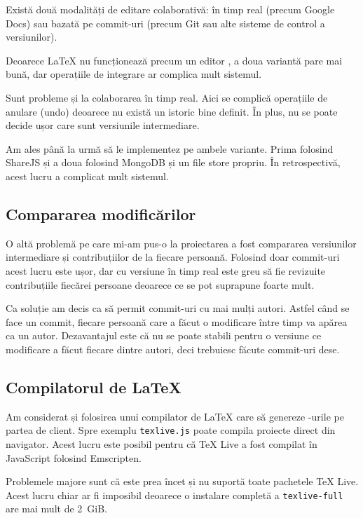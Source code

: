 \documentclass[a4wide,12pt]{report}
\newcommand{\eng}[1]{{#1}} %
\newcommand{\cod}[1]{\texttt{#1}}
\newcommand{\acr}[1]{{\textsmaller[1]{\textsc{#1}}}} %
\begin{document}
Există două modalități de editare colaborativă: în timp real (precum Google
Docs) sau bazată pe commit-uri (precum Git sau alte sisteme de control a
versiunilor).

Deoarece \LaTeX{} nu funcționează precum un editor \acr{WYSIWYG}, a doua
variantă pare mai bună, dar operațiile de integrare ar complica mult sistemul.

Sunt probleme și la colaborarea în timp real. Aici se complică operațiile de
anulare (\eng{undo}) deoarece nu există un istoric bine definit. În plus, nu se
poate decide ușor care sunt versiunile intermediare.

Am ales până la urmă să le implementez pe ambele variante. Prima folosind
ShareJS și a doua folosind MongoDB și un \eng{file store} propriu. În
retrospectivă, acest lucru a complicat mult sistemul.

\subsection{Compararea modificărilor}

O altă problemă pe care mi-am pus-o la proiectarea a fost compararea versiunilor
intermediare și contribuțiilor de la fiecare persoană. Folosind doar
\eng{commit}-uri acest lucru este ușor, dar cu versiune în timp real este greu
să fie revizuite contribuțiile fiecărei persoane deoarece ce se pot suprapune
foarte mult.

Ca soluție am decis ca să permit \eng{commit}-uri cu mai mulți autori. Astfel
când se face un \eng{commit}, fiecare persoană care a făcut o modificare între
timp va apărea ca un autor. Dezavantajul este că nu se poate stabili pentru o
versiune ce modificare a făcut fiecare dintre autori, deci trebuiesc făcute
\eng{commit}-uri dese.

\subsection{Compilatorul de \LaTeX}

Am considerat și folosirea unui compilator de \LaTeX{} care să genereze
\acr{PDF}-urile pe partea de client. Spre exemplu \cod{texlive.js}\cite{texlivejs}
poate compila proiecte direct din navigator. Acest lucru este posibil pentru că
\TeX{} Live a fost compilat în JavaScript folosind Emscripten.

Problemele majore sunt că este prea încet și nu suportă toate pachetele \TeX{}
Live. Acest lucru chiar ar fi imposibil deoarece o instalare completă a
\cod{texlive-full} are mai mult de 2~GiB.
\end{document}
